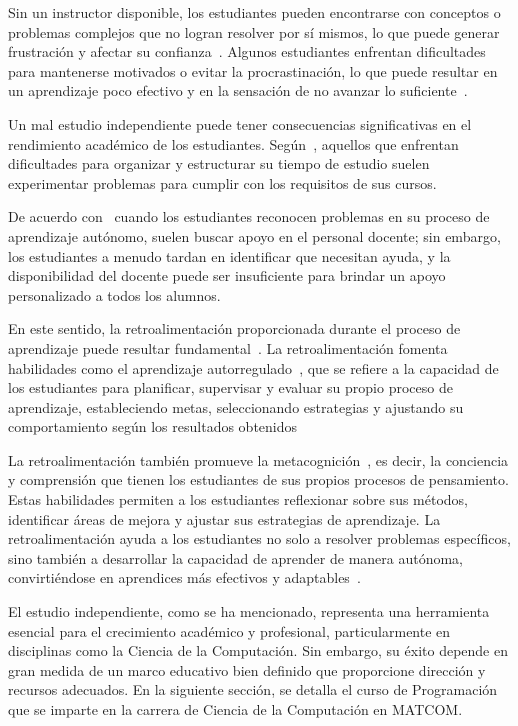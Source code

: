 Sin un instructor disponible, los estudiantes pueden encontrarse con conceptos o problemas complejos que no logran resolver por sí mismos, lo que puede generar frustración y afectar su confianza~\cite{overklift2019}. Algunos estudiantes enfrentan dificultades para mantenerse motivados o evitar la procrastinación, lo que puede resultar en un aprendizaje poco efectivo y en la sensación de no avanzar lo suficiente~\cite{coto02012022}. 

Un mal estudio independiente puede tener consecuencias significativas en el rendimiento académico de los estudiantes. Según~\cite{overklift2019}, aquellos que enfrentan dificultades para organizar y estructurar su tiempo de estudio suelen experimentar problemas para cumplir con los requisitos de sus cursos.

De acuerdo con~\cite{overklift2019} cuando los estudiantes reconocen problemas en su proceso de aprendizaje autónomo, suelen buscar apoyo en el personal docente; sin embargo, los estudiantes a menudo tardan en identificar que necesitan ayuda, y la disponibilidad del docente puede ser insuficiente para brindar un apoyo personalizado a todos los alumnos.

En este sentido, la retroalimentación proporcionada durante el proceso de aprendizaje puede resultar fundamental~\cite{Sarsa_2022}. La retroalimentación fomenta habilidades como el aprendizaje autorregulado~\cite{Sarsa_2022}, que se refiere a la capacidad de los estudiantes para planificar, supervisar y evaluar su propio proceso de aprendizaje, estableciendo metas, seleccionando estrategias y ajustando su comportamiento según los resultados obtenidos

La retroalimentación también promueve la metacognición~\cite{Sarsa_2022}, es decir, la conciencia y comprensión que tienen los estudiantes de sus propios procesos de pensamiento. Estas habilidades permiten a los estudiantes reflexionar sobre sus métodos, identificar áreas de mejora y ajustar sus estrategias de aprendizaje. La retroalimentación ayuda a los estudiantes no solo a resolver problemas específicos, sino también a desarrollar la capacidad de aprender de manera autónoma, convirtiéndose en aprendices más efectivos y adaptables~\cite{shute2008focus}.

El estudio independiente, como se ha mencionado, representa una herramienta esencial para el crecimiento académico y profesional, particularmente en disciplinas como la Ciencia de la Computación. Sin embargo, su éxito depende en gran medida de un marco educativo bien definido que proporcione dirección y recursos adecuados. En la siguiente sección, se detalla el curso de Programación que se imparte en la carrera de Ciencia de la Computación en \mbox{MATCOM}.

